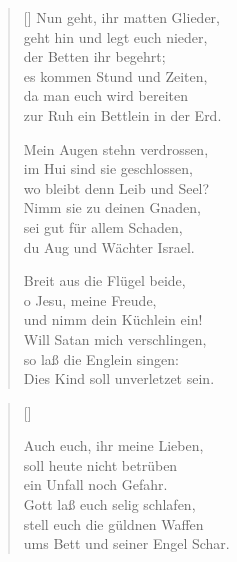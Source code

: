 \begin{multicols}{2}
\begin{verse}[\versewidth]
 Nun geht, ihr matten Glieder,\\
geht hin und legt euch nieder,\\
der Betten ihr begehrt;\\
es kommen Stund und Zeiten,\\
da man euch wird bereiten\\
zur Ruh ein Bettlein in der Erd.

 Mein Augen stehn verdrossen,\\
im Hui sind sie geschlossen,\\
wo bleibt denn Leib und Seel?\\
Nimm sie zu deinen Gnaden,\\
sei gut für allem Schaden,\\
du Aug und Wächter Israel.

 Breit aus die Flügel beide,\\
o Jesu, meine Freude,\\
und nimm dein Küchlein ein!\\
Will Satan mich verschlingen,\\
so laß die Englein singen:\\
Dies Kind soll unverletzet sein.

\end{verse}
\end{multicols}

\begin{center}
\settowidth{\versewidth}{Der, vor dem die Welt erschrickt,}
\begin{verse}[\versewidth]

 Auch euch, ihr meine Lieben,\\
soll heute nicht betrüben\\
ein Unfall noch Gefahr.\\
Gott laß euch selig schlafen,\\
stell euch die güldnen Waffen\\
ums Bett und seiner Engel Schar.


  
\end{verse}
\end{center}



